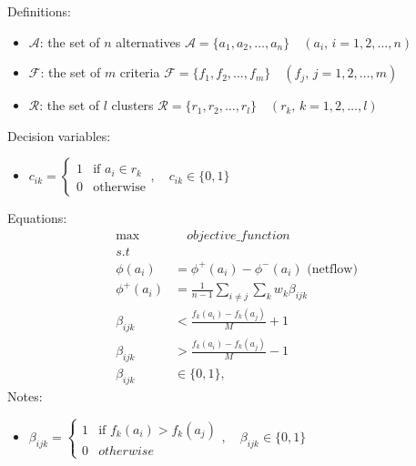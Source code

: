 \documentclass[a4paper]{article}
\begin{document}
    Definitions:
    \begin{itemize}
        \item $\mathcal{A}$: the set of $n$ alternatives $\mathcal{A} = \{a_1, a_2, \dots, a_n\} \quad (a_i,\, i = 1, 2, \dots, n)$
        \item $\mathcal{F}$: the set of $m$ criteria $\mathcal{F} = \{f_1, f_2, \dots, f_m\} \quad (f_j,\, j = 1, 2, \dots, m)$
        \item $\mathcal{R}$: the set of $l$ clusters $\mathcal{R} = \{r_1, r_2, \dots, r_l\} \quad (r_k,\, k = 1, 2, \dots, l)$
    \end{itemize}
    Decision variables:
    \begin{itemize}
        \item $c_{ik} = \begin{cases}
            1 & \text{if } a_i \in r_k\\
            0 & \text{otherwise}
        \end{cases}, \quad c_{ik} \in \{0, 1\}$
    \end{itemize}
    Equations:
    \begin{align*}
        \max & \quad objective\_function\\
        s.t & \\
        \phi(a_i) &= \phi^+(a_i) - \phi^-(a_i) \text{ (netflow)}\\
        \phi^+(a_i) &= \frac{1}{n-1} \sum_{i \neq j}^{} \sum_{k}{} w_k \beta_{ijk}\\
        \beta_{ijk} &< \frac{f_k(a_i)-f_k(a_j)}{M} + 1\\
        \beta_{ijk} &> \frac{f_k(a_i)-f_k(a_j)}{M} - 1\\
        \beta_{ijk} &\in \{0,1\},
    \end{align*}
    Notes:
    \begin{itemize}
        \item $\beta_{ijk} = \begin{cases}
            1 & \text{if } f_k(a_i) > f_k(a_j)\\
            0 & otherwise
        \end{cases}, \quad \beta_{ijk} \in \{0, 1\}$
    \end{itemize}
\end{document}
